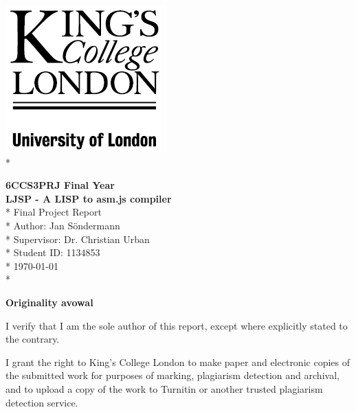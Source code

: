 \documentclass[11pt]{report}
\begin{document}


\thispagestyle{empty}
\begin{center}
    {\large
        \begin{flushright}
              \includegraphics[scale=0.4]{kingslogo.png}\\*
        \end{flushright}
        \vspace*{2.2in}
        {\huge \bf{6CCS3PRJ Final Year\\\vspace{0.2cm}LJSP - A LISP to asm.js compiler}}\\*
        \vspace*{0.4in}
        \Large{Final Project Report}\\*
        \vspace*{1.2in}
        \large{Author: Jan S\"ondermann\\*
                   Supervisor: Dr. Christian Urban}\\*
                   Student ID: 1134853\\*
        \vspace*{0.2in}
        {\today}\\*
    }
\end{center}
\restoregeometry

\begin{center}
\textbf{Originality avowal}
\end{center}

I verify that I am the sole author of this report, except where explicitly stated to the contrary.

I grant the right to King's College London to make paper and electronic copies of the submitted work for purposes of marking, plagiarism detection and archival, and to upload a copy of the work to Turnitin or another trusted plagiarism detection service.\\
\end{document}
